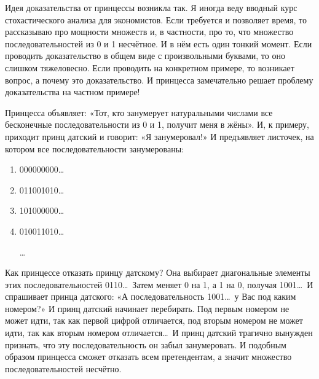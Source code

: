 \documentclass[10pt]{article}
\begin{document}
Идея доказательства от принцессы возникла так. Я иногда веду вводный курс стохастического анализа для экономистов. Если требуется и позволяет время, то рассказываю про мощности множеств и, в частности, про то, что множество последовательностей из 0 и 1 несчётное. И в нём есть один тонкий момент. Если проводить доказательство в общем виде с произвольными буквами, то оно слишком тяжеловесно. Если проводить на конкретном примере, то возникает вопрос, а почему это доказательство. И принцесса замечательно решает  проблему доказательства на частном примере!

Принцесса объявляет: «Тот, кто занумерует натуральными числами все бесконечные последовательности из 0 и 1, получит меня в жёны». И, к примеру, приходит принц датский и говорит: «Я занумеровал!» И предъявляет листочек, на котором все последовательности занумерованы:

\begin{enumerate}
\item 000000000\ldots
\item 011001010\ldots
\item 101000000\ldots
\item 010011010\ldots

\ldots
\end{enumerate}

Как принцессе отказать принцу датскому? Она выбирает диагональные элементы этих последовательностей 0110\ldots\, Затем меняет 0 на 1, а 1 на 0, получая 1001\ldots\, И спрашивает принца датского: «А последовательность 1001\ldots\, у Вас под каким номером?» И принц датский начинает перебирать. Под первым номером не может идти, так как первой цифрой отличается, под вторым номером не может идти, так как вторым номером отличается\ldots\, И принц датский трагично вынужден признать, что эту последовательность он забыл занумеровать. И подобным образом принцесса сможет отказать всем претендентам, а значит множество последовательностей несчётно.
\end{document}
